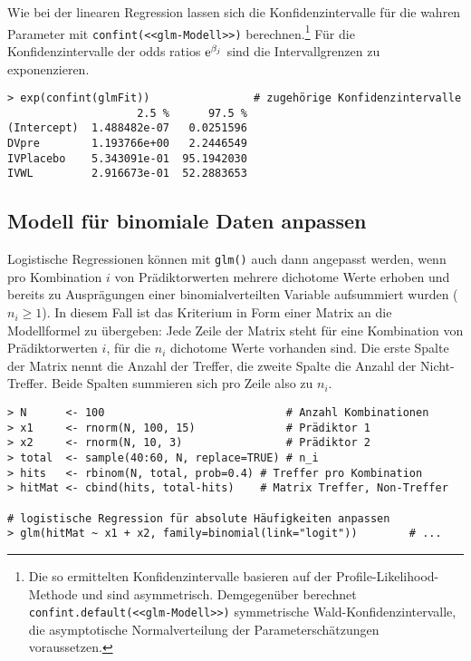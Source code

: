 Wie bei der linearen Regression lassen sich die Konfidenzintervalle für die wahren Parameter mit \lstinline!confint(<<glm-Modell>>)! berechnen.\footnote{\label{ftn:ciDefault}Die so ermittelten Konfidenzintervalle basieren auf der Profile-Likelihood-Methode und sind asymmetrisch. Demgegenüber berechnet \lstinline!confint.default(<<glm-Modell>>)! symmetrische Wald-Konfidenzintervalle, die asymptotische Normalverteilung der Parameterschätzungen voraussetzen.} Für die Konfidenzintervalle der odds ratios ${\mathrm{e}}^{\beta_{j}}$ sind die Intervallgrenzen zu exponenzieren.
\begin{lstlisting}
> exp(confint(glmFit))                # zugehörige Konfidenzintervalle
                    2.5 %      97.5 %
(Intercept)  1.488482e-07   0.0251596
DVpre        1.193766e+00   2.2446549
IVPlacebo    5.343091e-01  95.1942030
IVWL         2.916673e-01  52.2883653
\end{lstlisting}

\subsection{Modell für binomiale Daten anpassen}
\label{sec:glmLogisticBinom}

Logistische Regressionen können mit \lstinline!glm()! auch dann angepasst werden, wenn pro Kombination $i$ von Prädiktorwerten mehrere dichotome Werte erhoben und bereits zu Ausprägungen einer binomialverteilten Variable aufsummiert wurden ($n_{i} \geq 1$). In diesem Fall ist das Kriterium in Form einer Matrix an die Modellformel zu übergeben: Jede Zeile der Matrix steht für eine Kombination von Prädiktorwerten $i$, für die $n_{i}$ dichotome Werte vorhanden sind. Die erste Spalte der Matrix nennt die Anzahl der Treffer, die zweite Spalte die Anzahl der Nicht-Treffer. Beide Spalten summieren sich pro Zeile also zu $n_{i}$.
\begin{lstlisting}
> N      <- 100                            # Anzahl Kombinationen
> x1     <- rnorm(N, 100, 15)              # Prädiktor 1
> x2     <- rnorm(N, 10, 3)                # Prädiktor 2
> total  <- sample(40:60, N, replace=TRUE) # n_i
> hits   <- rbinom(N, total, prob=0.4) # Treffer pro Kombination
> hitMat <- cbind(hits, total-hits)    # Matrix Treffer, Non-Treffer

# logistische Regression für absolute Häufigkeiten anpassen
> glm(hitMat ~ x1 + x2, family=binomial(link="logit"))        # ...
\end{lstlisting}

